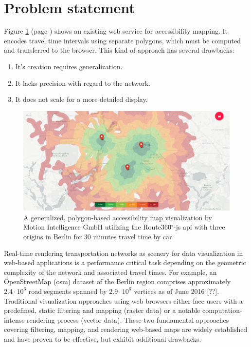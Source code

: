   \section{Problem statement}
    \label{sec:intro:probl}

    Figure \ref{fig:intro:r360d} (page \pageref{fig:intro:r360d}) shows an existing web service for accessibility
    mapping. It encodes travel time intervals using separate polygons, which
    must be computed and transferred to the browser. This kind of approach has
    several drawbacks:\par

    \begin{enumerate}[\label=({D}1)]
      \item \label{enu:drawb:d1} It's creation requires generalization.
      \item \label{enu:drawb:d2} It lacks precision with regard to the network.
      \item \label{enu:drawb:d3} It does not scale for a more detailed display.
    \end{enumerate}

    \begin{figure}[ht]
      \centering
      \includegraphics[width=\linewidth]
        {./img/screenshot-r360js-demo.png}
      \caption{A generalized, polygon-based accessibility map visualization
        by Motion Intelligence GmbH utilizing the Route360$^\circ$-\acrshort{js}
        \acrshort{api} \cite{Route360} with three origins in Berlin for 30
        minutes travel time by car.}
      \label{fig:intro:r360d}
    \end{figure}

    Real-time rendering transportation networks as scenery for data
    visualization in web-based applications is a performance critical task
    depending on the geometric complexity of the network and associated travel
    times. For example, an OpenStreetMap (\acrshort{osm}) dataset of the Berlin
    region comprises approximately $2.4 \cdot 10^6$ road segments spanned by
    $2.9 \cdot 10^6$ vertices as of June 2016 [??]. Traditional visualization
    approaches using web browsers either face users with a predefined, static
    filtering and mapping (raster data) or a notable computation-intense
    rendering process (vector data). These two fundamental approaches covering
    filtering, mapping, and rendering web-based maps are widely established and
    have proven to be effective, but exhibit additional drawbacks.\par

